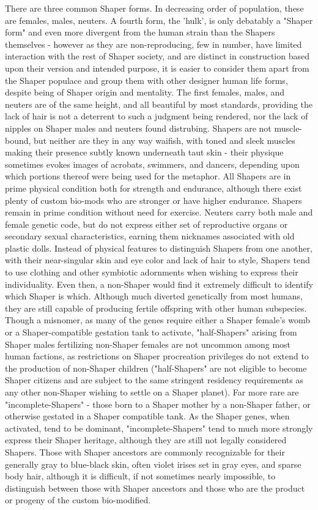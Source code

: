 There are three common Shaper forms. In decreasing order of
population, these are females, males, neuters. A fourth form, the
'hulk', is only debatably a "Shaper form" and even more divergent from
the human strain than the Shapers themselves - however as they are
non-reproducing, few in number, have limited interaction with the rest
of Shaper society, and are distinct in construction based upon their
version and intended purpose, it is easier to consider them apart from
the Shaper populace and group them with other designer human life
forms, despite being of Shaper origin and mentality. The first
females, males, and neuters are of the same height, and all beautiful
by most standards, providing the lack of hair is not a deterrent to
such a judgment being rendered, nor the lack of nipples on Shaper
males and neuters found distrubing. Shapers are not muscle-bound, but
neither are they in any way waifish, with toned and sleek muscles
making their presence subtly known underneath taut skin - their
physique sometimes evokes images of acrobats, swimmers, and dancers,
depending upon which portions thereof were being used for the
metaphor. All Shapers are in prime physical condition both for
strength and endurance, although there exist plenty of custom bio-mods
who are stronger or have higher endurance. Shapers remain in prime
condition without need for exercise. Neuters carry both male and
female genetic code, but do not express either set of reproductive
organs or secondary sexual characteristics, earning them nicknames
associated with old plastic dolls. Instead of physical features to
distinguish Shapers from one another, with their near-singular skin
and eye color and lack of hair to style, Shapers tend to use clothing
and other symbiotic adornments when wishing to express their
individuality. Even then, a non-Shaper would find it extremely
difficult to identify which Shaper is which. Although much diverted
genetically from most humans, they are still capable of producing
fertile offspring with other human subspecies. Though a misnomer, as
many of the genes require either a Shaper female's womb or a
Shaper-compatible gestation tank to activate, "half-Shapers" arising
from Shaper males fertilizing non-Shaper females are not uncommon
among most human factions, as restrictions on Shaper procreation
privileges do not extend to the production of non-Shaper children
("half-Shapers" are not eligible to become Shaper citizens and are
subject to the same stringent residency requirements as any other
non-Shaper wishing to settle on a Shaper planet). Far more rare are
"incomplete-Shapers" - those born to a Shaper mother by a non-Shaper
father, or otherwise gestated in a Shaper compatible tank. As the
Shaper genes, when activated, tend to be dominant,
"incomplete-Shapers" tend to much more strongly express their Shaper
heritage, although they are still not legally considered
Shapers. Those with Shaper ancestors are commonly recognizable for
their generally gray to blue-black skin, often violet irises set in
gray eyes, and sparse body hair, although it is difficult, if not
sometimes nearly impossible, to distinguish between those with Shaper
ancestors and those who are the product or progeny of the custom
bio-modified.


